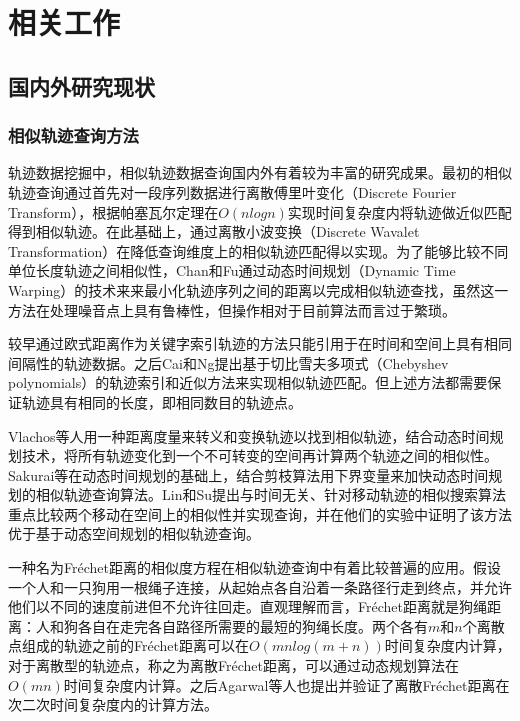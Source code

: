 
\chapter{相关工作}
\label{chap:related}


\section{国内外研究现状}
\label{sec:situation}

\subsection{相似轨迹查询方法}
\label{subsec:situation-methods}
轨迹数据挖掘中，相似轨迹数据查询国内外有着较为丰富的研究成果。最初的相似轨迹查询通过首先对一段序列数据进行离散傅里叶变化（Discrete Fourier Transform），根据帕塞瓦尔定理在$O(nlogn)$实现时间复杂度内将轨迹做近似匹配得到相似轨迹\cite{agrawal1993efficient}。在此基础上，通过离散小波变换（Discrete Wavalet Transformation）在降低查询维度上的相似轨迹匹配得以实现\cite{chan1999efficient}。为了能够比较不同单位长度轨迹之间相似性，Chan和Fu通过动态时间规划（Dynamic Time Warping）的技术来来最小化轨迹序列之间的距离以完成相似轨迹查找\cite{bernad1996finding}，虽然这一方法在处理噪音点上具有鲁棒性，但操作相对于目前算法而言过于繁琐。

较早通过欧式距离作为关键字索引轨迹的方法\cite{yanagisawa2003shape}只能引用于在时间和空间上具有相同间隔性的轨迹数据。之后Cai和Ng提出基于切比雪夫多项式（Chebyshev polynomials）的轨迹索引和近似方法来实现相似轨迹匹配\cite{cai2004indexing}。但上述方法都需要保证轨迹具有相同的长度，即相同数目的轨迹点。

Vlachos等人用一种距离度量来转义和变换轨迹以找到相似轨迹\cite{vlachos2004rotation}，结合动态时间规划技术，将所有轨迹变化到一个不可转变的空间再计算两个轨迹之间的相似性。Sakurai等在动态时间规划的基础上，结合剪枝算法用下界变量来加快动态时间规划的相似轨迹查询算法\cite{sakurai2005ftw}。Lin和Su提出与时间无关、针对移动轨迹的相似搜索算法重点比较两个移动在空间上的相似性并实现查询，并在他们的实验中证明了该方法优于基于动态空间规划的相似轨迹查询。

一种名为Fr\'{e}chet\cite{alt1995computing}距离的相似度方程在相似轨迹查询中有着比较普遍的应用。假设一个人和一只狗用一根绳子连接，从起始点各自沿着一条路径行走到终点，并允许他们以不同的速度前进但不允许往回走。直观理解而言，Fr\'{e}chet距离就是狗绳距离：人和狗各自在走完各自路径所需要的最短的狗绳长度。两个各有$m$和$n$个离散点组成的轨迹之前的Fr\'{e}chet距离可以在$O(mnlog(m+n))$时间复杂度内计算，对于离散型的轨迹点，\cite{alt1995computing}称之为离散Fr\'{e}chet距离，可以通过动态规划算法在$O(mn)$时间复杂度内计算。之后Agarwal等人\cite{agarwal2014computing}也提出并验证了离散Fr\'{e}chet距离在次二次时间复杂度内的计算方法。


